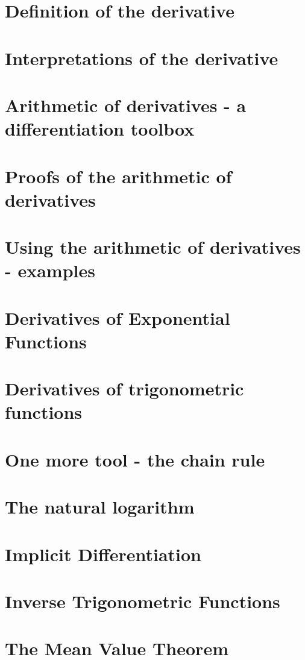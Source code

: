 \documentclass[12pt,letterpaper]{book}
\begin{document}
\section{Definition of the derivative}

\section{Interpretations of the derivative}

\section{Arithmetic of derivatives - a differentiation toolbox}

%
\section{Proofs of the arithmetic of derivatives} 
%
\section{Using the arithmetic of derivatives - examples}

\section{Derivatives of Exponential Functions}

\section{Derivatives of trigonometric functions}

\section{One more tool - the chain rule}

\section{The natural logarithm}

\section{Implicit Differentiation}

\section{Inverse Trigonometric Functions}

\section{The Mean Value Theorem}

\end{document}
